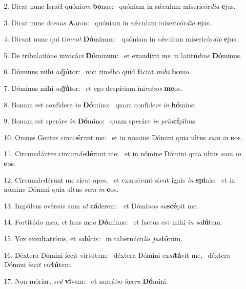 2. Dicat nunc Israël quóni\textit{am} \textbf{bo}nus: \ast\  quóniam in sǽculum misericór\textit{di}\textit{a} \textbf{e}jus.\

3. Dicat nunc do\textit{mus} \textbf{A}aron: \ast\  quóniam in sǽculum misericór\textit{di}\textit{a} \textbf{e}jus.\

4. Dicant nunc qui ti\textit{ment} \textbf{Dó}minum: \ast\  quóniam in sǽculum misericór\textit{di}\textit{a} \textbf{e}jus.\

5. De tribulatióne invocá\textit{vi} \textbf{Dó}minum: \ast\  et exaudívit me in latitú\textit{di}\textit{ne} \textbf{Dó}minus.\

6. Dóminus mihi \textit{ad}\textbf{jú}tor: \ast\  non timébo quid fáciat \textit{mi}\textit{hi} \textbf{ho}mo.\

7. Dóminus mihi \textit{ad}\textbf{jú}tor: \ast\  et ego despíciam ini\textit{mí}\textit{cos} \textbf{me}os.\

8. Bonum est confídere \textit{in} \textbf{Dó}mino: \ast\  quam confíde\textit{re} \textit{in} \textbf{hó}mine.\

9. Bonum est speráre \textit{in} \textbf{Dó}mino: \ast\  quam speráre \textit{in} \textit{prin}\textbf{cí}pibus.\

10. Omnes Gentes circu\textit{i}\textbf{é}runt me: \ast\  et in nómine Dómini quia ultus \textit{sum} \textit{in} \textbf{e}os.\

11. Circumdántes circum\textit{de}\textbf{dé}runt me: \ast\  et in nómine Dómini quia ultus \textit{sum} \textit{in} \textbf{e}os.\

12. Circumdedérunt me sicut apes, \dag\  et exarsérunt sicut ignis \textit{in} \textbf{spi}nis: \ast\  et in nómine Dómini quia ultus \textit{sum} \textit{in} \textbf{e}os.\

13. Impúlsus evérsus sum \textit{ut} \textbf{cá}derem: \ast\  et Dómi\textit{nus} \textit{su}\textbf{scé}pit me.\

14. Fortitúdo mea, et laus me\textit{a} \textbf{Dó}minus: \ast\  et factus est mihi \textit{in} \textit{sa}\textbf{lú}tem.\

15. Vox exsultatiónis, et \textit{sa}\textbf{lú}tis: \ast\  in tabernácu\textit{lis} \textit{jus}\textbf{tó}rum.\

16. Déxtera Dómini fecit virtútem: \dag\  déxtera Dómini ex\textit{al}\textbf{tá}vit me, \ast\  déxtera Dómini fe\textit{cit} \textit{vir}\textbf{tú}tem.\

17. Non móriar, \textit{sed} \textbf{vi}vam: \ast\  et narrábo ó\textit{pe}\textit{ra} \textbf{Dó}mini.\

